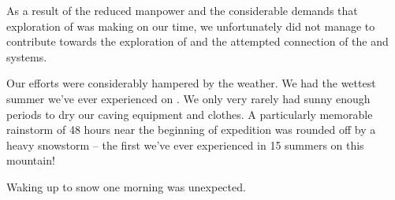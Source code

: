 As a result of the reduced manpower and the considerable demands that
exploration of  was making on our time, we unfortunately
did not manage to contribute towards the exploration of  and the attempted connection of the  and 
systems.


Our efforts were considerably hampered by the weather. We had the
wettest summer we've ever experienced on . We only very rarely
had sunny enough periods to dry our caving equipment and clothes. A
particularly memorable rainstorm of 48 hours near the beginning of
expedition was rounded off by a heavy snowstorm -- the first we've ever
experienced in 15 summers on this mountain!

\begin{marginfigure}
\checkoddpage \ifoddpage \forcerectofloat \else \forceversofloat \fi
\centering
 \caption{Waking up to snow one morning was unexpected. }
 \label{snow day}
\end{marginfigure}

